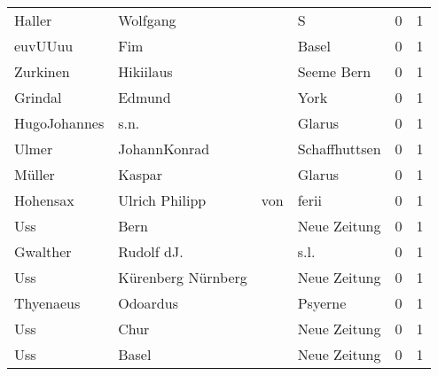 \begin{center}
\begin{tiny}
\begin{longtabu}{llllrr}
                   Haller &                           Wolfgang &             &                                           S &          0 &         1 \\
                  euvUUuu &                                Fim &             &                                       Basel &          0 &         1 \\
                 Zurkinen &                          Hikiilaus &             &                                  Seeme Bern &          0 &         1 \\
                  Grindal &                             Edmund &             &                                        York &          0 &         1 \\
             HugoJohannes &                               s.n. &             &                                      Glarus &          0 &         1 \\
                    Ulmer &                       JohannKonrad &             &                               Schaffhuttsen &          0 &         1 \\
                   Müller &                             Kaspar &             &                                      Glarus &          0 &         1 \\
                 Hohensax &                     Ulrich Philipp &         von &                                       ferii &          0 &         1 \\
                      Uss &                               Bern &             &                                Neue Zeitung &          0 &         1 \\
                 Gwalther &                         Rudolf dJ. &             &                                        s.l. &          0 &         1 \\
                      Uss &                 Kürenberg Nürnberg &             &                                Neue Zeitung &          0 &         1 \\
                Thyenaeus &                           Odoardus &             &                                     Psyerne &          0 &         1 \\
                      Uss &                               Chur &             &                                Neue Zeitung &          0 &         1 \\
                      Uss &                              Basel &             &                                Neue Zeitung &          0 &         1 \\

\end{longtabu}
\end{tiny}
\end{center}
